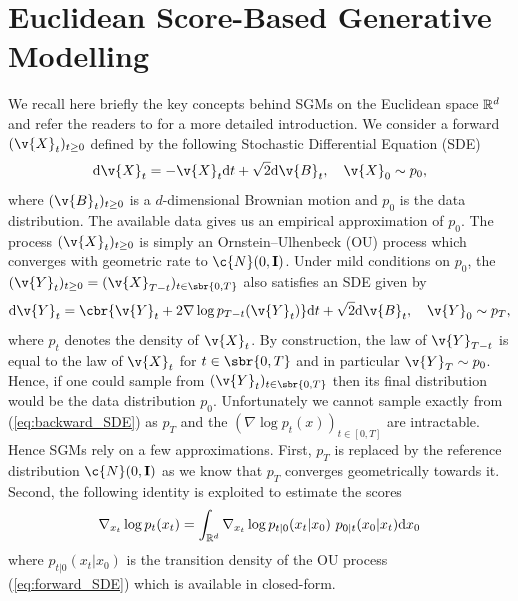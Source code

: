 \section{Euclidean Score-Based Generative Modelling} \label{sec:eucl-sgm-riem} We recall here briefly the key concepts behind SGMs on the Euclidean space $\mathbb{R}^d$ and refer the readers to \textcite{song2020score} for a more detailed introduction.
We consider a forward  $(\v{X}_t)_{t \geq 0}$ defined by the following Stochastic Differential Equation (SDE) \begin{equation}\label{eq:forward_SDE} \mathrm{d} \v{X}_t = -\v{X}_t \mathrm{d} t + \sqrt{2} \mathrm{d} \v{B}_t,\quad \v{X}_0 \sim p_0 , \end{equation} where $(\v{B}_t)_{t \geq 0}$ is a $d$-dimensional Brownian motion and $p_0$ is the data distribution.
The available data gives us an empirical approximation of $p_0$.
The process $(\v{X}_t)_{t \geq 0}$ is simply an Ornstein--Ulhenbeck (OU) process which converges with geometric rate to $\c{N}(0,\m{I})$.
Under mild conditions on $p_0$, the  $(\v{Y}_t)_{t \geq 0} = (\v{X}_{T-t})_{t \in \sbr{0,T}}$ also satisfies an SDE \parencite{cattiaux2021time,haussmann1986time} given by \begin{equation} \label{eq:backward_SDE} \mathrm{d} \v{Y}_t = \cbr{ \v{Y}_t + 2 \nabla \log p_{T-t}(\v{Y}_t)} \mathrm{d} t + \sqrt{2} \mathrm{d} \v{B}_t,\quad \v{Y}_0 \sim p_T , \end{equation} where $p_t$ denotes the density of $\v{X}_t$.
By construction, the law of $\v{Y}_{T-t}$ is equal to the law of $\v{X}_t$ for $t \in \sbr{0,T}$ and in particular $\v{Y}_{T}\sim p_0$.
Hence, if one could sample from $(\v{Y}_t)_{t \in \sbr{0,T}}$ then its final distribution would be the data distribution $p_0$.
Unfortunately we cannot sample exactly from (\ref{eq:backward_SDE}) as $p_T$ and the  $(\nabla \log p_t(x))_{t\in[0,T]}$ are intractable.
Hence SGMs rely on a few approximations.
First, $p_T$ is replaced by the reference distribution $\c{N}(0,\m{I})$ as we know that $p_T$ converges geometrically towards it.
Second, the following  identity is exploited to estimate the scores \begin{equation}\label{eq:scoreidentity} \nabla_{x_t} \log p_t(x_t) = \int_{\mathbb{R}^d} \nabla_{x_t} \log p_{t|0}(x_t|x_0)~p_{0|t}(x_0|x_t) \mathrm{d} x_0 \end{equation} where $p_{t|0}(x_t|x_0)$ is the transition density of the OU process (\ref{eq:forward_SDE}) which is available in closed-form.
